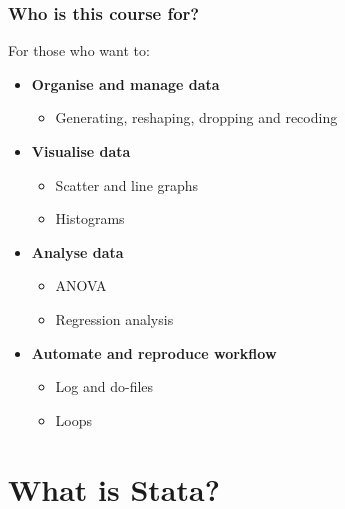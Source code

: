 \documentclass[10pt, compress]{beamer}
\begin{document}
\begin{frame}[fragile]
  \frametitle{Who is this course for?}

    For those who want to:
        \begin{itemize}
            \item \textbf{Organise and manage data}
                \begin{itemize}
                    \item Generating, reshaping, dropping and recoding
                \end{itemize}
            \item \textbf{Visualise data}
                \begin{itemize}
                    \item Scatter and line graphs
                    \item Histograms
                \end{itemize}
            \item \textbf{Analyse data}
                \begin{itemize}
                    \item ANOVA
                    \item Regression analysis
                \end{itemize}
            \item \textbf{Automate and reproduce workflow}
                \begin{itemize}
                    \item Log and do-files
                    \item Loops
                \end{itemize}
        \end{itemize}
      
\end{frame}

\section{What is Stata?}
\end{document}
